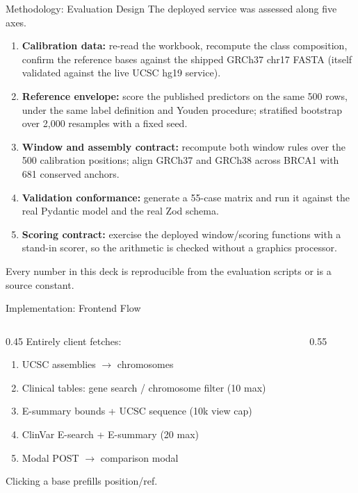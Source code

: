 \documentclass[aspectratio=169,10pt]{beamer}
\begin{document}
\begin{frame}{Methodology: Evaluation Design}
The deployed service was assessed along five axes.
\begin{enumerate}
\item \textbf{Calibration data:} re-read the workbook, recompute the class composition, confirm the reference bases against the shipped GRCh37 chr17 FASTA (itself validated against the live UCSC hg19 service).
\item \textbf{Reference envelope:} score the published predictors on the same 500 rows, under the same label definition and Youden procedure; stratified bootstrap over 2,000 resamples with a fixed seed.
\item \textbf{Window and assembly contract:} recompute both window rules over the 500 calibration positions; align GRCh37 and GRCh38 across BRCA1 with 681 conserved anchors.
\item \textbf{Validation conformance:} generate a 55-case matrix and run it against the real Pydantic model and the real Zod schema.
\item \textbf{Scoring contract:} exercise the deployed window/scoring functions with a stand-in scorer, so the arithmetic is checked without a graphics processor.
\end{enumerate}
Every number in this deck is reproducible from the evaluation scripts or is a source constant.
\end{frame}

\begin{frame}{Implementation: Frontend Flow}
\begin{columns}[T]
\begin{column}{0.45\textwidth}
\small Entirely client fetches:
\begin{enumerate}\small
\item UCSC assemblies $\rightarrow$ chromosomes
\item Clinical tables: gene search / chromosome filter (10 max)
\item E-summary bounds + UCSC sequence (10k view cap)
\item ClinVar E-search + E-summary (20 max)
\item Modal POST $\rightarrow$ comparison modal
\end{enumerate}
\small Clicking a base prefills position/ref.
\end{column}
\begin{column}{0.55\textwidth}
\centering
{}
\end{column}
\end{columns}
\end{frame}
\end{document}
